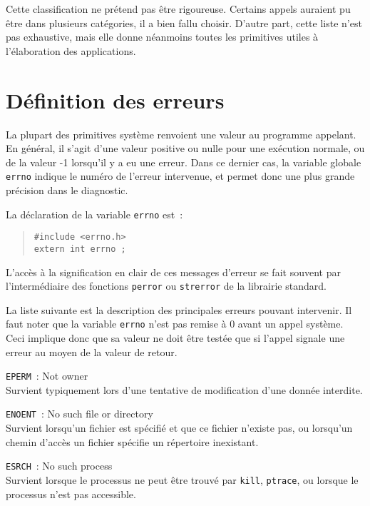 \documentclass [twoside] {report}
\begin{document}
Cette classification ne prétend pas être
rigoureuse. Certains appels auraient pu être dans
plusieurs catégories, il a bien fallu choisir.
D'autre part, cette liste n'est pas exhaustive,
mais elle donne néanmoins toutes les primitives
utiles à l'élaboration des applications.




\section {Définition des erreurs}


La plupart des primitives système renvoient une valeur au programme
appelant. En général, il s'agit d'une valeur
positive ou nulle pour une exécution normale, ou
de la valeur -1 lorsqu'il y a eu une erreur. Dans
ce dernier cas, la variable globale {\tt errno}
indique le numéro de l'erreur intervenue, et
permet donc une plus grande précision dans le
diagnostic.

La déclaration de la variable {\tt errno} est~:

\begin {quote}
\begin {verbatim}
#include <errno.h>
extern int errno ;
\end{verbatim}
\end {quote}

L'accès à la signification en clair de ces
messages d'erreur se fait souvent par
l'intermédiaire des fonctions {\tt perror}
ou \texttt {strerror} de la
librairie standard.

La liste suivante est la description
des principales erreurs pouvant intervenir. Il faut noter que
la variable {\tt errno} n'est pas remise à 0 avant un
appel système. Ceci implique donc que sa valeur ne
doit être testée que si l'appel signale une
erreur au moyen de la valeur de retour.

{\tt EPERM}~: Not owner \\
Survient typiquement lors d'une
tentative de modification d'une donnée interdite.

{\tt ENOENT}~: No such file or directory \\
Survient lorsqu'un fichier est spécifié et que ce
fichier n'existe pas, ou lorsqu'un chemin d'accès
un fichier spécifie un répertoire inexistant.

{\tt ESRCH}~: No such process \\
Survient lorsque le processus ne peut être trouvé
par {\tt kill}, {\tt ptrace}, ou lorsque le processus
n'est pas accessible.
\end{document}
